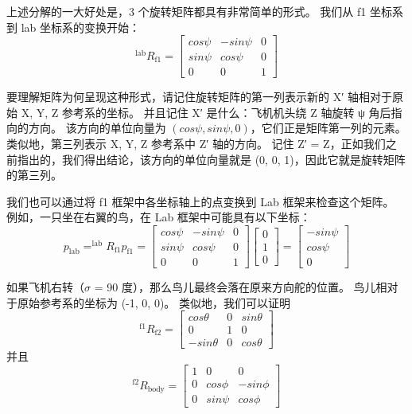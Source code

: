 上述分解的一大好处是，3 个旋转矩阵都具有非常简单的形式。
我们从 f1 坐标系到 lab 坐标系的变换开始：
\begin{equation}
	^\text{lab} R_\text{f1} = 
		\begin{bmatrix} %
			cos \psi & -sin \psi & 0 \\
			sin \psi & cos \psi  & 0 \\
			0 & 0 & 1
		\end{bmatrix}
	\label{eq:7_6}
\end{equation}


要理解矩阵为何呈现这种形式，请记住旋转矩阵的第一列表示新的 X′ 轴相对于原始 {X, Y, Z} 参考系的坐标。
并且记住 X′ 是什么：飞机机头绕 Z 轴旋转 ψ 角后指向的方向。
该方向的单位向量为 $(cos \psi, sin \psi, 0)$，它们正是矩阵第一列的元素。类似地，第三列表示 {X, Y, Z} 参考系中 Z′ 轴的方向。
记住 Z′ = Z，正如我们之前指出的，我们得出结论，该方向的单位向量就是 (0, 0, 1)，因此它就是旋转矩阵的第三列。


我们也可以通过将 f1 框架中各坐标轴上的点变换到 Lab 框架来检查这个矩阵。
例如，一只坐在右翼的鸟，在 Lab 框架中可能具有以下坐标：
%
\begin{equation}
	p_\text{lab}
	= ^\text{lab} R_\text{f1} p_\text{f1}
	= \begin{bmatrix}
		cos \psi & -sin \psi & 0 \\
		sin \psi & cos \psi & 0 \\
		0 & 0 & 1
	  \end{bmatrix}
	  \begin{bmatrix}
	  	0 \\
	  	1 \\
	  	0
	  \end{bmatrix}
	= \begin{bmatrix}
		-sin \psi \\
		cos \psi \\
		0
	\end{bmatrix}
	\label{eq:7_7}
\end{equation}


如果飞机右转（$\sigma$ = 90 度），那么鸟儿最终会落在原来方向舵的位置。
鸟儿相对于原始参考系的坐标为 (-1, 0, 0)。
类似地，我们可以证明
%
\begin{equation}
	^\text{f1} R_\text{f2} = 
		\begin{bmatrix}
			cos \theta & 0 & sin \theta \\
			0 & 1 & 0 \\
			-sin \theta & 0 & cos \theta
		\end{bmatrix}
	\label{eq:7_8}
\end{equation}
并且
\begin{equation}
	^\text{f2} R_\text{body}
		= \begin{bmatrix}
			1 & 0 & 0 \\
			0 & cos \phi & -sin \phi \\
			0 & sin \psi & cos \phi
		\end{bmatrix}
	\label{eq:7_9}
\end{equation}



